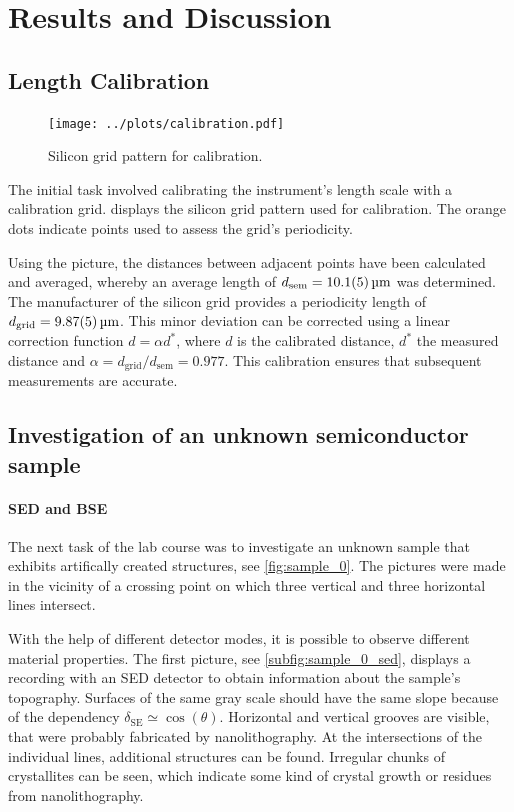 \section{Results and Discussion}
\subsection{Length Calibration}

\begin{figure}
	\centering
	\texttt{[image: ../plots/calibration.pdf]}
	\caption{Silicon grid pattern for calibration.}
	\label{fig:calibration}
\end{figure}

The initial task involved calibrating the instrument's length scale with a calibration grid.
 displays the silicon grid pattern
used for calibration.
The orange dots indicate points used to assess the grid's periodicity.

Using the picture, the distances between adjacent points have
been calculated and averaged, whereby an average length of
$d_{\mathrm{sem}}=\qty{10.1 \pm 0.5}{\micro\meter}$ was determined.
The manufacturer of the silicon grid provides a periodicity length of
$d_{\mathrm{grid}}=\qty{9.87\pm 0.05}{\micro\meter}$.
This minor deviation can be corrected using a linear
correction function $d = \alpha d^*$, where $d$ is the calibrated
distance, $d^*$ the measured distance and
$\alpha=d_{\mathrm{grid}} /d_{\mathrm{sem}} = \num{0.977}$.
This calibration ensures that subsequent measurements are accurate.

\subsection{Investigation of an unknown semiconductor sample}
\paragraph{SED and BSE}
The next task of the lab course was to investigate an unknown sample
that exhibits artifically created structures, see \cref{fig:sample_0}.
The pictures were made in the vicinity of a crossing
point on which three vertical and three horizontal lines intersect.

With the help of different detector modes, it is possible to observe
different material properties.
The first picture, see \cref{subfig:sample_0_sed}, displays a recording
with an SED detector to obtain information about the sample's topography.
Surfaces of the same gray scale should have the same slope because of the
dependency $\delta_\mathrm{SE} \simeq \cos(\theta)$.
Horizontal and vertical grooves are visible, that were probably
fabricated by nanolithography.
At the intersections of the individual lines, additional structures can
be found.
Irregular chunks of crystallites can be seen, which indicate
some kind of crystal growth or residues from nanolithography.

